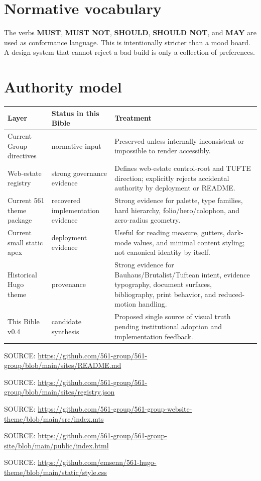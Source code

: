 \documentclass[11pt,twoside,openany]{report}
\newcommand{\MUST}{\textbf{MUST}\xspace}
\newcommand{\MUSTNOT}{\textbf{MUST NOT}\xspace}
\newcommand{\SHOULD}{\textbf{SHOULD}\xspace}
\newcommand{\SHOULDNOT}{\textbf{SHOULD NOT}\xspace}
\newcommand{\MAY}{\textbf{MAY}\xspace}
\newcommand{\Source}[1]{\par{\FSOEvidence\fontsize{7}{9}\selectfont\color{FSOInkSoft}SOURCE: \url{#1}}}
\begin{document}
\section*{Normative vocabulary}
The verbs \MUST, \MUSTNOT, \SHOULD, \SHOULDNOT, and \MAY are used as conformance language. This is intentionally stricter than a mood board. A design system that cannot reject a bad build is only a collection of preferences.

\section*{Authority model}
\begin{tabularx}{\textwidth}{@{}L{31mm}L{32mm}Y@{}}
\toprule
Layer & Status in this Bible & Treatment\\
\midrule
Current Group directives & normative input & Preserved unless internally inconsistent or impossible to render accessibly.\\
Web-estate registry & strong governance evidence & Defines web-estate control-root and TUFTE direction; explicitly rejects accidental authority by deployment or README.\\
Current 561 theme package & recovered implementation evidence & Strong evidence for palette, type families, hard hierarchy, folio/hero/colophon, and zero-radius geometry.\\
Current small static apex & deployment evidence & Useful for reading measure, gutters, dark-mode values, and minimal content styling; not canonical identity by itself.\\
Historical Hugo theme & provenance & Strong evidence for Bauhaus/Brutalist/Tuftean intent, evidence typography, document surfaces, bibliography, print behavior, and reduced-motion handling.\\
This Bible v0.4 & candidate synthesis & Proposed single source of visual truth pending institutional adoption and implementation feedback.\\
\bottomrule
\end{tabularx}

\Source{https://github.com/561-group/561-group/blob/main/sites/README.md}
\Source{https://github.com/561-group/561-group/blob/main/sites/registry.json}
\Source{https://github.com/561-group/561-group-website-theme/blob/main/src/index.mts}
\Source{https://github.com/561-group/561-group-site/blob/main/public/index.html}
\Source{https://github.com/emsenn/561-hugo-theme/blob/main/static/style.css}

\clearpage
\tableofcontents
\clearpage
\end{document}
